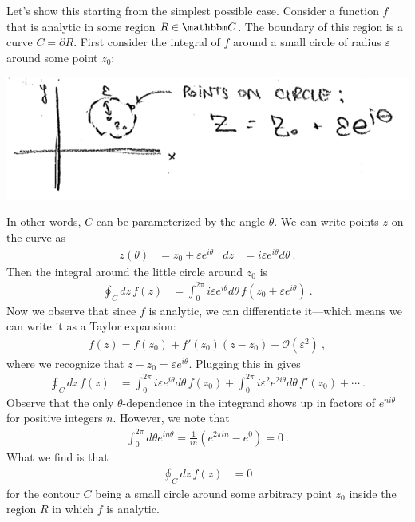Let's show this starting from the simplest possible case. Consider a function $f$ that is analytic in some region $R\in \mathbbm C$. The boundary of this region is a curve $C = \partial R$. First consider the integral of $f$ around a small circle of radius $\varepsilon$ around some point $z_0$:
\begin{center}
\includegraphics[width=.7\textwidth]{figures/Lec_2017_12_circle.png}
\end{center}
In other words, $C$ can be parameterized by the angle $\theta$. We can write points $z$ on the curve as
\begin{align}
	z(\theta) &= z_0 + \varepsilon e^{i\theta} 
	&
	dz &= i \varepsilon e^{i\theta} d\theta \ .
\end{align}
Then the integral around the little circle around $z_0$ is
\begin{align}
	\oint_C dz\, f(z) &= \int_0^{2\pi} i \varepsilon e^{i\theta} d\theta \, f\left( z_0 + \varepsilon e^{i\theta} \right) \ .
\end{align}
Now we observe that since $f$ is analytic, we can differentiate it---which means we can write it as a Taylor expansion:
\begin{align}
	f(z)
	 = f(z_0) + f'(z_0)(z-z_0) + \mathcal O(\varepsilon^2) \ ,
\end{align}
where we recognize that $z-z_0 = \varepsilon e^{i\theta}$. Plugging this in gives
\begin{align}
	\oint_C dz\, f(z) &= 
	\int_0^{2\pi} i \varepsilon e^{i\theta} d\theta \, f(z_0) 
	+
	\int_0^{2\pi} i \varepsilon^2 e^{2i\theta} d\theta \, f'(z_0) 
	+ \cdots
	\ .
\end{align}
Observe that the only $\theta$-dependence in the integrand shows up in factors of $e^{n i\theta}$ for positive integers $n$. However, we note that
\begin{align}
	\int_0^{2\pi} d\theta e^{in\theta} 
	= 
	\frac{1}{in} \left(e^{2\pi i n} - e^{0}\right)
	= 0 \ .
	\label{eq:complex:theta:integral:trivial}
\end{align}
What we find is that 
\begin{align}
	\oint_C dz\, f(z) &= 0
\end{align}
for the contour $C$ being a small circle around some arbitrary point $z_0$ inside the region $R$ in which $f$ is analytic. 
